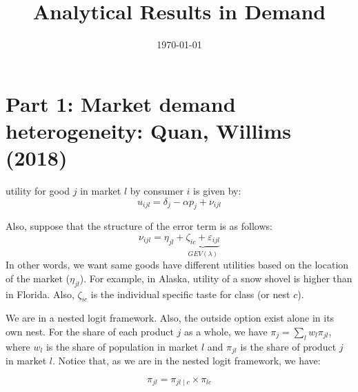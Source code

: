\documentclass [11pt]{article}
\begin{document}
\title{Analytical Results in Demand}

\date{\today}
\maketitle
\section*{Part 1: Market demand
heterogeneity: Quan, Willims (2018)}
utility for good $j$ in market $l$ by consumer
$i$ is given by:
\begin{equation}
  u_{ijl} = \delta_j - \alpha p_j + 
  \nu_{ijl}
\end{equation}

Also, suppose that the structure of the
error term is as follows:
\begin{equation}
  \nu_{ijl}=\eta_{jl}+
  \underbrace{\zeta_{ic}+
  \varepsilon_{ijl}}_{GEV(\lambda)}
\end{equation}
In other words, we want same goods have 
different utilities based on the 
location of the market ($\eta_{jl}$). 
For example, in 
Alaska, utility of a snow shovel is higher
than in Florida. Also, $\zeta_{ic}$ is the 
individual specific taste for class (or 
nest $c$).

We are in a nested logit framework. Also,
the outside option exist alone in its 
own nest. 
For the share of each product $j$ as a whole,
we have $\pi_j = \sum_{l} w_l \pi_{jl}$, 
where $w_l$ is the share of population in 
market $l$ and $\pi_{jl}$ is the share of
product $j$ in market $l$. Notice that, as 
we are in the nested logit framework, we have:

\begin{equation}
  \pi_{jl} = \pi_{jl\mid c} \times \pi_{lc}
\end{equation}
\end{document}

